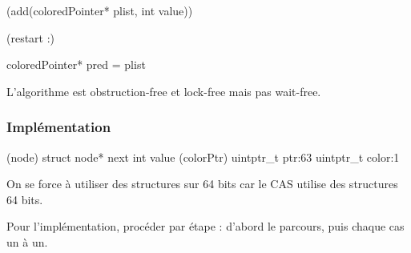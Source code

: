 \documentclass{article}
\begin{document}
\begin{algorithm}[H]
\Void({add(coloredPointer* plist, int value)}){
	\Label(restart :){
		coloredPointer* pred = plist\;
		
		
	}
}

\end{algorithm}


L'algorithme est obstruction-free et lock-free mais pas wait-free.

\subsubsection*{Implémentation}
\begin{algorithm}[H]
\Struct(node){
	struct node* next\;
	int value\;
}
\Struct(colorPtr){
	uintptr\_t ptr:63
	uintptr\_t color:1\;
}
\end{algorithm}
On se force à utiliser des structures sur 64 bits car le CAS utilise des structures 64 bits.
\bigskip

Pour l'implémentation, procéder par étape : d'abord le parcours, puis chaque cas un à un.
\end{document}
